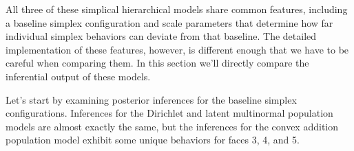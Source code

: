 \documentclass[
  letterpaper,
  DIV=11,
  numbers=noendperiod]{scrartcl}
\newenvironment{Shaded}{\begin{snugshade}}{\end{snugshade}}
\newcommand{\AttributeTok}[1]{\textcolor[rgb]{0.40,0.45,0.13}{#1}}
\newcommand{\ControlFlowTok}[1]{\textcolor[rgb]{0.00,0.23,0.31}{#1}}
\newcommand{\DecValTok}[1]{\textcolor[rgb]{0.68,0.00,0.00}{#1}}
\newcommand{\FloatTok}[1]{\textcolor[rgb]{0.68,0.00,0.00}{#1}}
\newcommand{\FunctionTok}[1]{\textcolor[rgb]{0.28,0.35,0.67}{#1}}
\newcommand{\NormalTok}[1]{\textcolor[rgb]{0.00,0.23,0.31}{#1}}
\newcommand{\OtherTok}[1]{\textcolor[rgb]{0.00,0.23,0.31}{#1}}
\newcommand{\SpecialCharTok}[1]{\textcolor[rgb]{0.37,0.37,0.37}{#1}}
\newcommand{\StringTok}[1]{\textcolor[rgb]{0.13,0.47,0.30}{#1}}
\begin{document}
All three of these simplical hierarchical models share common features,
including a baseline simplex configuration and scale parameters that
determine how far individual simplex behaviors can deviate from that
baseline. The detailed implementation of these features, however, is
different enough that we have to be careful when comparing them. In this
section we'll directly compare the inferential output of these models.

Let's start by examining posterior inferences for the baseline simplex
configurations. Inferences for the Dirichlet and latent multinormal
population models are almost exactly the same, but the inferences for
the convex addition population model exhibit some unique behaviors for
faces 3, 4, and 5.

\begin{Shaded}
\end{Shaded}
\end{document}
